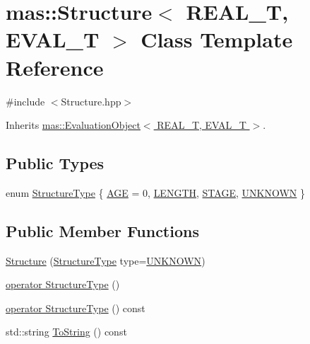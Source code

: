 \hypertarget{classmas_1_1_structure}{}\section{mas\+:\+:Structure$<$ R\+E\+A\+L\+\_\+\+T, E\+V\+A\+L\+\_\+\+T $>$ Class Template Reference}
\label{classmas_1_1_structure}


{\ttfamily \#include $<$Structure.\+hpp$>$}



Inherits \hyperlink{classmas_1_1_evaluation_object}{mas\+::\+Evaluation\+Object$<$ R\+E\+A\+L\+\_\+\+T, E\+V\+A\+L\+\_\+\+T $>$}.

\subsection*{Public Types}
\begin{DoxyCompactItemize}
\item 
enum \hyperlink{classmas_1_1_structure_a727ec3dc2ba5133a94b368ff3fb9f391}{Structure\+Type} \{ \hyperlink{classmas_1_1_structure_a727ec3dc2ba5133a94b368ff3fb9f391ad170bd3595f63a00507e8f6580501aca}{A\+G\+E} = 0, 
\hyperlink{classmas_1_1_structure_a727ec3dc2ba5133a94b368ff3fb9f391a725071afb475725d3735481c0fccbad1}{L\+E\+N\+G\+T\+H}, 
\hyperlink{classmas_1_1_structure_a727ec3dc2ba5133a94b368ff3fb9f391a237b21de429cf518d9a4679693165232}{S\+T\+A\+G\+E}, 
\hyperlink{classmas_1_1_structure_a727ec3dc2ba5133a94b368ff3fb9f391a745322f8b0095403b54fa46ac00ffa9a}{U\+N\+K\+N\+O\+W\+N}
 \}
\end{DoxyCompactItemize}
\subsection*{Public Member Functions}
\begin{DoxyCompactItemize}
\item 
\hyperlink{classmas_1_1_structure_add793973e83de587d02b418420b4bc50}{Structure} (\hyperlink{classmas_1_1_structure_a727ec3dc2ba5133a94b368ff3fb9f391}{Structure\+Type} type=\hyperlink{classmas_1_1_structure_a727ec3dc2ba5133a94b368ff3fb9f391a745322f8b0095403b54fa46ac00ffa9a}{U\+N\+K\+N\+O\+W\+N})
\item 
\hyperlink{classmas_1_1_structure_ab383d8ceba4053c0d929f185516bd646}{operator Structure\+Type} ()
\item 
\hyperlink{classmas_1_1_structure_afc70ae1bcc21a95db8545c33e41204e5}{operator Structure\+Type} () const 
\item 
std\+::string \hyperlink{classmas_1_1_structure_afc04ba037b160a8faa16849b3e41443c}{To\+String} () const 
\end{DoxyCompactItemize}

